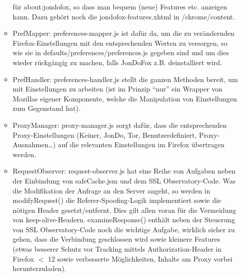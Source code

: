 \documentclass[a4paper,10pt]{scrartcl}
\begin{document}
\begin{itemize}
\begin{itemize}
            für about:jondofox, so dass man bequem (neue) Features etc. anzeigen
            kann. Dazu gehört noch die jondofox-features.xhtml in
            /chrome/content.
          \item PrefMapper: preferences-mapper.js ist dafür da, um die zu
            verändernden Firefox-Einstellungen mit den entsprechenden Werten zu
            versorgen, so wie sie in defaults/preferences/preferences.js gegeben
            sind und um dies wieder rückgängig zu machen, falls JonDoFox z.B.
            deinstalliert wird.
          \item PrefHandler: preferences-handler.js stellt die ganzen Methoden
            bereit, um mit Einstellungen zu arbeiten (ist im Prinzip ``nur'' ein
            Wrapper von Mozillas eigener Komponente, welche die Manipulation von
            Einstellungen zum Gegenstand hat).
          \item ProxyManager: proxy-manager.js sorgt dafür, dass die
            entsprechenden Proxy-Einstellungen (Keiner, JonDo, Tor,
            Benutzerdefiniert, Proxy-Ausnahmen\ldots) auf die relevanten
            Einstellungen im Firefox übertragen werden.
          \item RequestObserver: request-observer.js hat eine Reihe von Aufgaben
            neben der Einbindung von safeCache.jsm und dem SSL Observatory-Code.
            Was die Modifikation der Anfrage an den Server angeht, so werden in
            modifyRequest() die Referer-Spoofing-Logik implementiert sowie die
            nötigen Header gesetzt/entfernt. Dies gilt allen voran für die
            Vermeidung von keep-alive-Headern. examineResponse() enthält neben
            der Steuerung von SSL Observatory-Code noch die wichtige Aufgabe,
            wirklich sicher zu gehen, dass die Verbindung geschlossen wird sowie
            kleinere Features (etwas besserer Schutz vor Tracking mittels
            Authorization-Header in Firefox $<$ 12 sowie verbesserte
            Möglichkeiten, Inhalte am Proxy vorbei herunterzuladen).
        \end{itemize}
      \end{itemize}
\end{document}
